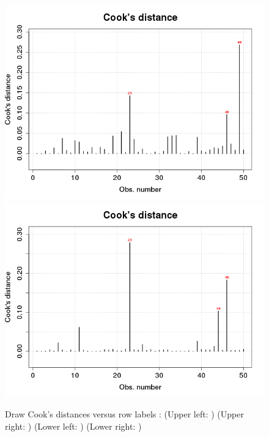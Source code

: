 \begin{figure}[p]
\begin{center}
    \includegraphics[scale=0.4]{imgOT/model1-drawCookDistance.png}\hspace*{1cm}
	\includegraphics[scale=0.4]{imgOT/model2-drawCookDistance.png}\\
  \end{center}
  \caption{Draw Cook's distances versus row labels  :\newline
  (Upper left: \textbf{\color{black}{model1: R output}}) (Upper right: \textbf{\color{black}{model2: R output}}) \newline
  (Lower left: \textbf{\color{blue}{model1: python output}})  (Lower right: \textbf{\color{blue}{model2: python output}}) }
\end{figure}

